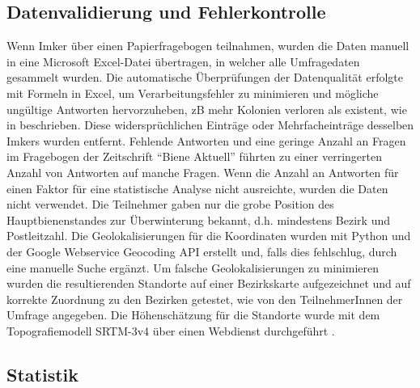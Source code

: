 \subsection{Datenvalidierung und Fehlerkontrolle}

Wenn Imker über einen Papierfragebogen teilnahmen, wurden die Daten manuell in eine Microsoft Excel-Datei übertragen, in welcher alle Umfragedaten gesammelt wurden. Die automatische Überprüfungen der Datenqualität erfolgte mit Formeln in Excel, um Verarbeitungsfehler zu minimieren und mögliche ungültige Antworten hervorzuheben, zB mehr Kolonien verloren als existent, wie in \cite{vanderzee2013, brodschneider2013} beschrieben. Diese widersprüchlichen Einträge oder Mehrfacheinträge desselben Imkers wurden entfernt. Fehlende Antworten und eine geringe Anzahl an Fragen im Fragebogen der Zeitschrift \enquote{Biene Aktuell} führten zu einer verringerten Anzahl von Antworten auf manche Fragen. Wenn die Anzahl an Antworten für einen Faktor für eine statistische Analyse nicht ausreichte, wurden die Daten nicht verwendet.
\newline
Die Teilnehmer gaben nur die grobe Position des Hauptbienenstandes zur Überwinterung bekannt, d.h. mindestens Bezirk und Postleitzahl. Die Geolokalisierungen für die Koordinaten wurden mit Python und der Google Webservice Geocoding API erstellt und, falls dies fehlschlug, durch eine manuelle Suche ergänzt. Um falsche Geolokalisierungen zu minimieren wurden die resultierenden Standorte  auf einer Bezirkskarte aufgezeichnet und auf korrekte Zuordnung zu den Bezirken getestet, wie von den TeilnehmerInnen der Umfrage angegeben. Die Höhenschätzung für die Standorte wurde mit dem Topografiemodell SRTM-3v4 über einen Webdienst durchgeführt \citep{geonames}.

\subsection{Statistik}

